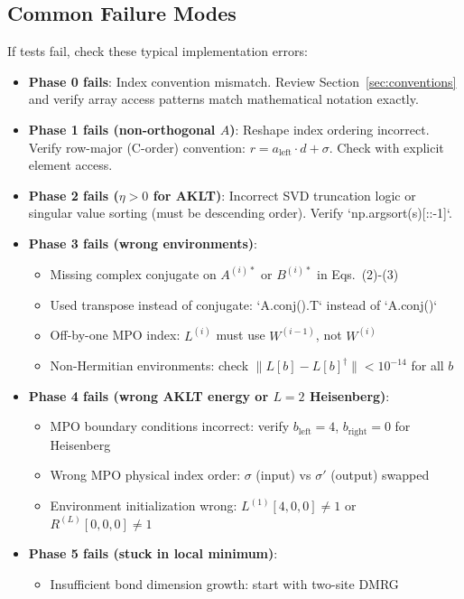 \documentclass[aps,prb,onecolumn,scriptaddress]{revtex4-2}
\begin{document}
	\subsection{Common Failure Modes}
	
	If tests fail, check these typical implementation errors:
	
	\begin{itemize}
		\item \textbf{Phase 0 fails}: Index convention mismatch. Review Section~\ref{sec:conventions} and verify array access patterns match mathematical notation exactly.
		\item \textbf{Phase 1 fails (non-orthogonal $A$)}: Reshape index ordering incorrect. Verify row-major (C-order) convention: $r = a_{\text{left}} \cdot d + \sigma$. Check with explicit element access.
		\item \textbf{Phase 2 fails ($\eta > 0$ for AKLT)}: Incorrect SVD truncation logic or singular value sorting (must be descending order). Verify `np.argsort(s)[::-1]`.
		\item \textbf{Phase 3 fails (wrong environments)}: 
		\begin{itemize}
			\item Missing complex conjugate on $A^{(i)*}$ or $B^{(i)*}$ in Eqs.~(2)-(3)
			\item Used transpose instead of conjugate: `A.conj().T` instead of `A.conj()`
			\item Off-by-one MPO index: $L^{(i)}$ must use $W^{(i-1)}$, not $W^{(i)}$
			\item Non-Hermitian environments: check $\|L[b] - L[b]^\dagger\| < 10^{-14}$ for all $b$
		\end{itemize}
		\item \textbf{Phase 4 fails (wrong AKLT energy or $L=2$ Heisenberg)}: 
		\begin{itemize}
			\item MPO boundary conditions incorrect: verify $b_{\text{left}}=4$, $b_{\text{right}}=0$ for Heisenberg
			\item Wrong MPO physical index order: $\sigma$ (input) vs $\sigma'$ (output) swapped
			\item Environment initialization wrong: $L^{(1)}[4,0,0] \neq 1$ or $R^{(L)}[0,0,0] \neq 1$
		\end{itemize}
		\item \textbf{Phase 5 fails (stuck in local minimum)}: 
		\begin{itemize}
			\item Insufficient bond dimension growth: start with two-site DMRG

\end{itemize}
\end{itemize}
\end{document}

